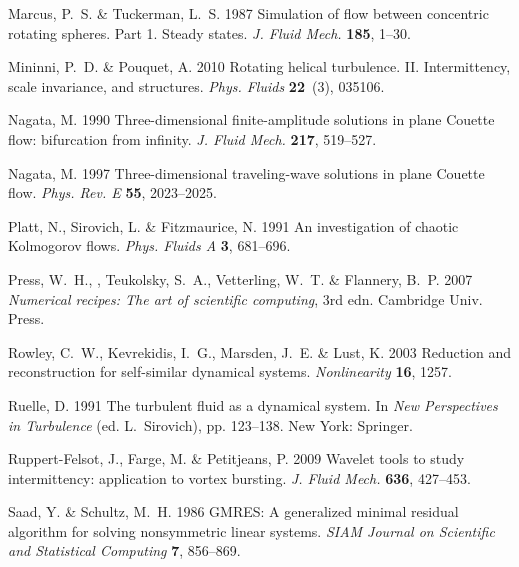 \documentclass{jfm}
\begin{document}
\begin{thebibliography}{68}
{\sc Marcus, P.~S. \& Tuckerman, L.~S.} 1987 Simulation of flow between
  concentric rotating spheres. {P}art 1. {S}teady states. {\em J. Fluid
  Mech.\/} {\bf 185}, 1--30.

{\sc Mininni, P.~D. \& Pouquet, A.} 2010 Rotating helical turbulence. {II}.
  {I}ntermittency, scale invariance, and structures. {\em Phys. Fluids\/} {\bf
  22}~(3), 035106.

{\sc Nagata, M.} 1990 Three-dimensional finite-amplitude solutions in plane
  {C}ouette flow: bifurcation from infinity. {\em J. Fluid Mech.\/} {\bf 217},
  519--527.

{\sc Nagata, M.} 1997 Three-dimensional traveling-wave solutions in plane
  {C}ouette flow. {\em Phys. Rev. E\/} {\bf 55}, 2023--2025.

{\sc Platt, N., Sirovich, L. \& Fitzmaurice, N.} 1991 An investigation of
  chaotic {Kolmogorov} flows. {\em Phys. Fluids A\/} {\bf 3}, 681--696.

{\sc Press, W.~H., , Teukolsky, S.~A., Vetterling, W.~T. \& Flannery, B.~P.}
  2007 {\em Numerical recipes: {T}he art of scientific computing\/}, 3rd edn.
  Cambridge Univ. Press.

{\sc Rowley, C.~W., Kevrekidis, I.~G., Marsden, J.~E. \& Lust, K.} 2003
  Reduction and reconstruction for self-similar dynamical systems. {\em
  Nonlinearity\/} {\bf 16}, 1257.

{\sc Ruelle, D.} 1991 The turbulent fluid as a dynamical system. In {\em New
  Perspectives in Turbulence\/} (ed. L.~Sirovich), pp. 123--138. New York:
  Springer.

{\sc Ruppert-Felsot, J., Farge, M. \& Petitjeans, P.} 2009 Wavelet tools to
  study intermittency: application to vortex bursting. {\em J. Fluid Mech.\/}
  {\bf 636}, 427--453.

{\sc Saad, Y. \& Schultz, M.~H.} 1986 {GMRES}: A generalized minimal residual
  algorithm for solving nonsymmetric linear systems. {\em SIAM Journal on
  Scientific and Statistical Computing\/} {\bf 7}, 856--869.


\end{thebibliography}
\end{document}
